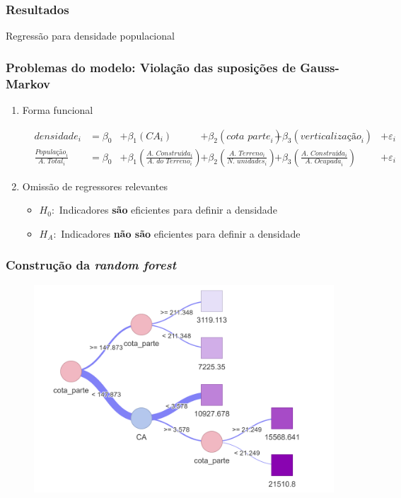 \documentclass[%
    9pt, 
    aspectratio=169,
]{beamer}
\begin{document}
\begin{frame}
    \frametitle{Resultados}
    \begin{table}
        \caption{Regressão para densidade populacional}
        
    \end{table}
\end{frame}

\begin{frame}
    \frametitle{Problemas do modelo: Violação das suposições de Gauss-Markov}

    \begin{enumerate}
        \item Forma funcional

        \begin{align*}
            &\textit{densidade}_i 
            &=\beta_0 
            &+\beta_1 (\textit{CA}_i) 
            &+\beta_2 (\textit{cota parte}_i)
            &+\beta_3 (\textit{verticalização}_i)
            &+\varepsilon_i \\
            &\frac{\textit{População}_i}{\textit{A. Total}_i}
            &=\beta_0
            &+\beta_1\left(\frac{\textit{A. Construída}_i}{\textit{A. do Terreno}_i}\right)
            &+\beta_2\left(\frac{\textit{A. Terreno}_i}{\textit{N. unidades}_i}\right)
            &+\beta_3\left(\frac{\textit{A. Construída}_i}{\textit{A. Ocupada}_i}\right)
            &+\varepsilon_i
        \end{align*}

        \bigskip
        \item<2-> Omissão de regressores relevantes
        \begin{itemize}
            \item $H_0:$ Indicadores \textbf{são} eficientes para definir a densidade
            \item $H_A:$ Indicadores \textbf{não são} eficientes para definir a densidade
        \end{itemize}    
    \end{enumerate}
\end{frame}

\begin{frame}
    \frametitle{Construção da \textit{random forest}}
    \begin{figure}
        \includegraphics[width = .7\textwidth]{imagens/tree_example.png}
    \end{figure}
\end{frame}
\end{document}
